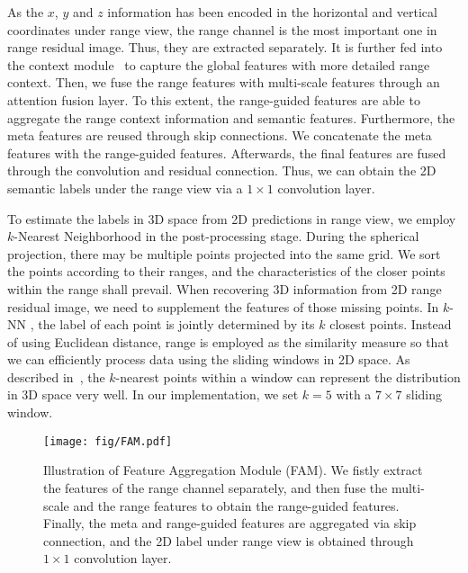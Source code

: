 \documentclass[letterpaper, 10 pt, journal, twoside]{ieeetran}
\begin{document}
As the $x$, $y$ and $z$ information has been encoded in the horizontal and vertical coordinates under range view, the range channel is the most important one in range residual image. Thus, they are extracted separately.
It is further fed into the context module~\cite{cortinhal2020salsanext} to capture the global features with more detailed range context. Then, we fuse the range features with multi-scale features through an attention fusion layer. To this extent, the range-guided features are able to aggregate the range context information and semantic features. Furthermore, the meta features are reused through skip connections. We concatenate the meta features with the range-guided features. Afterwards, the final features are fused through the convolution and residual connection. Thus, we can obtain the 2D semantic labels under the range view via a $1 \times 1$ convolution layer.


To estimate the labels in 3D space from 2D predictions in range view, we employ $k$-Nearest Neighborhood in the post-processing stage. During the spherical projection, there may be multiple points projected into the same grid. We sort the points according to their ranges, and the characteristics of the closer points within the range shall prevail. When recovering 3D information from 2D range residual image, we need to supplement the features of those missing points. In $k$-NN , the label of each point is jointly determined by its $k$ closest points. Instead of using Euclidean distance, range is employed as the similarity measure so that we can efficiently process data using the sliding windows in 2D space. As described in~\cite{milioto2019rangenet++}, the $k$-nearest points within a window can represent the distribution in 3D space very well. In our implementation, we set $k = 5$ with a $ 7 \times 7$ sliding window.

\begin{figure}
 \centering
 \setlength{\abovecaptionskip}{-0.2cm}
\texttt{[image: fig/FAM.pdf]}
    \caption{Illustration of Feature Aggregation Module (FAM). We fistly extract the features of the range channel separately, and then fuse the multi-scale and the range features to obtain the range-guided features. Finally, the meta and range-guided features are aggregated via skip connection, and the 2D label under range view is obtained through $1 \times 1$ convolution layer.}
    \label{fig:fourth}
    \vspace{-6mm}
\end{figure}
\end{document}
